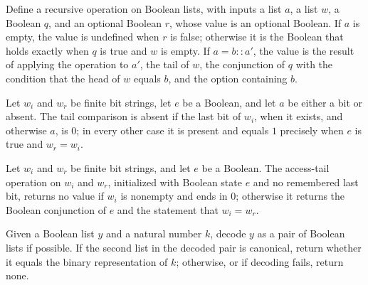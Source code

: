 \begin{definition}
\label{Complexity.LogProg.accessTail}
\leanok
Define a recursive operation on Boolean lists, with inputs a list $a$, a list $w$, a
Boolean $q$, and an optional Boolean $r$, whose value is an optional Boolean. If $a$ is
empty, the value is undefined when $r$ is false; otherwise it is the Boolean that holds
exactly when $q$ is true and $w$ is empty. If $a=b::a'$, the value is the result of
applying the operation to $a'$, the tail of $w$, the conjunction of $q$ with the
condition that the head of $w$ equals $b$, and the option containing $b$.
\end{definition}

\begin{lemma}
\label{Complexity.LogProg.accessTail_eq}
\leanok
{}
Let $w_i$ and $w_r$ be finite bit strings, let $e$ be a Boolean, and let $a$ be either a
bit or absent. The tail comparison is absent if the last bit of $w_i$, when it exists,
and otherwise $a$, is $0$; in every other case it is present and equals $1$ precisely
when $e$ is true and $w_r=w_i$.
\end{lemma}

\begin{lemma}
\label{Complexity.LogProg.accessTail_canonical}
\leanok
{}
Let $w_i$ and $w_r$ be finite bit strings, and let $e$ be a Boolean. The access-tail
operation on $w_i$ and $w_r$, initialized with Boolean state $e$ and no remembered last
bit, returns no value if $w_i$ is nonempty and ends in $0$; otherwise it returns the
Boolean conjunction of $e$ and the statement that $w_i=w_r$.
\end{lemma}

\begin{definition}
\label{Complexity.LogProg.accessCheck}
\leanok
{}
Given a Boolean list $y$ and a natural number $k$, decode $y$ as a pair of Boolean lists
if possible. If the second list in the decoded pair is canonical, return whether it
equals the binary representation of $k$; otherwise, or if decoding fails, return none.
\end{definition}

